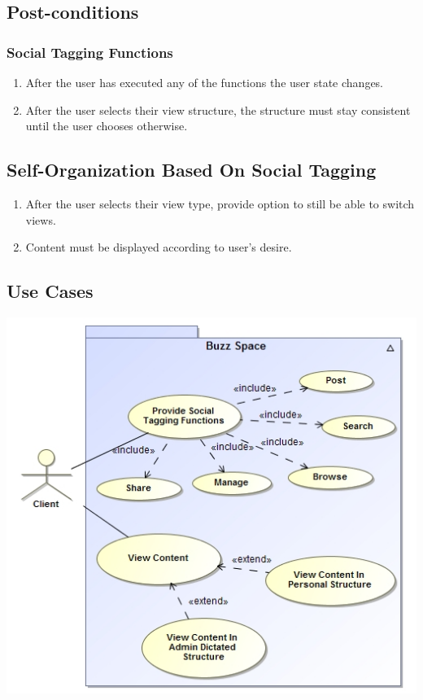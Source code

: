 \documentclass[12pt, oneside]{book}
\begin{document}
\subsection{Post-conditions}
\subsubsection{Social Tagging Functions}    
\begin{enumerate}
\item After the user has executed any of the functions the user state changes.
\item After the user selects their view structure, the structure must stay consistent until the user chooses otherwise.
\end{enumerate}
\subsection{Self-Organization Based On Social Tagging}
\begin{enumerate}
\item After the user selects their view type, provide option to still be able to switch views.
\item Content must be displayed according to user's desire.
\end{enumerate}
\subsection{Use Cases}
\includegraphics{socialTagging.jpg}
	\rule{0\linewidth}{0.15\linewidth}\par
\end{document}
